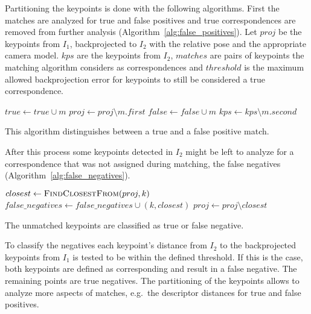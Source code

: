 Partitioning the keypoints is done with the following algorithms.
First the matches are analyzed for true and false positives and true correspondences are removed from further analysis (Algorithm~\ref{alg:false_positives}). 
Let $proj$ be the keypoints from $I_1$, backprojected to $I_2$ with the relative pose and the appropriate camera model.
$kps$ are the keypoints from $I_2$, $matches$ are pairs of keypoints the matching algorithm considers as correspondences and $threshold$ is the maximum allowed backprojection error for keypoints to still be considered a true correspondence.
\begin{algorithm}[H]
\footnotesize
\begin{algorithmic}[0]
        \State$true \gets true \cup m$
        \State$proj \gets proj \setminus m.first$
    \Else%
        \State$false \gets false \cup m$
    \EndIf%
    \State$kps \gets kps \setminus m.second$
    \EndFor%
    \EndFunction%
\end{algorithmic}
\caption{This algorithm distinguishes between a true and a false positive match.}\label{alg:false_positives}
\end{algorithm}
After this process some keypoints detected in $I_2$ might be left to analyze for a correspondence that was not assigned during matching, the false negatives (Algorithm~\ref{alg:false_negatives}).
\begin{algorithm}[H]
\footnotesize
\begin{algorithmic}
        \State$closest \gets \Call{FindClosestFrom}{proj, k}$
            \State$false\_negatives \gets false\_negatives \cup (k, closest)$
            \State$proj \gets proj \setminus closest$
        \EndIf
    \EndFor%
    \EndFunction%
\end{algorithmic}
\caption{The unmatched keypoints are classified as true or false negative.}\label{alg:false_negatives}
\end{algorithm}
To classify the negatives each keypoint's distance from $I_2$ to the backprojected keypoints from $I_1$ is tested to be within the defined threshold.
If this is the case, both keypoints are defined as corresponding and result in a false negative. The remaining points are true negatives.
The partitioning of the keypoints allows to analyze more aspects of matches, e.g.~the descriptor distances for true and false positives.

